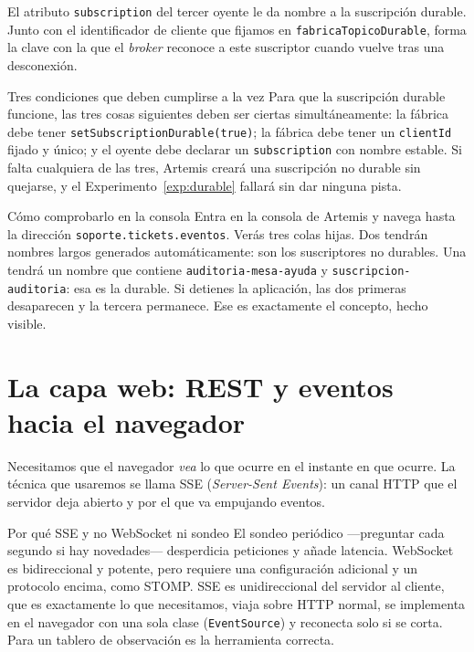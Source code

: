 \documentclass[11pt,a4paper]{book}
\begin{document}
El atributo \texttt{subscription} del tercer oyente le da nombre a la suscripción durable.
Junto con el identificador de cliente que fijamos en \texttt{fabricaTopicoDurable}, forma la clave con la que el \emph{broker} reconoce a este suscriptor cuando vuelve tras una desconexión.

\begin{cajaAviso}{Tres condiciones que deben cumplirse a la vez}
	Para que la suscripción durable funcione, las tres cosas siguientes deben ser ciertas simultáneamente:
	la fábrica debe tener \texttt{setSubscriptionDurable(true)};
	la fábrica debe tener un \texttt{clientId} fijado y único;
	y el oyente debe declarar un \texttt{subscription} con nombre estable.
	Si falta cualquiera de las tres, Artemis creará una suscripción no durable sin quejarse, y el Experimento~\ref{exp:durable} fallará sin dar ninguna pista.
\end{cajaAviso}

\begin{cajaTip}{Cómo comprobarlo en la consola}
	Entra en la consola de Artemis y navega hasta la dirección \texttt{soporte.tickets.eventos}.
	Verás tres colas hijas.
	Dos tendrán nombres largos generados automáticamente: son los suscriptores no durables.
	Una tendrá un nombre que contiene \texttt{auditoria-mesa-ayuda} y \texttt{suscripcion-auditoria}: esa es la durable.
	Si detienes la aplicación, las dos primeras desaparecen y la tercera permanece. Ese es exactamente el concepto, hecho visible.
\end{cajaTip}

\chapter{La capa web: REST y eventos hacia el navegador}
\label{cap:web}

Necesitamos que el navegador \emph{vea} lo que ocurre en el instante en que ocurre.
La técnica que usaremos se llama SSE (\emph{Server-Sent Events}): un canal HTTP que el servidor deja abierto y por el que va empujando eventos.

\begin{cajaNota}{Por qué SSE y no WebSocket ni sondeo}
	El sondeo periódico ---preguntar cada segundo si hay novedades--- desperdicia peticiones y añade latencia.
	WebSocket es bidireccional y potente, pero requiere una configuración adicional y un protocolo encima, como STOMP.
	SSE es unidireccional del servidor al cliente, que es exactamente lo que necesitamos, viaja sobre HTTP normal, se implementa en el navegador con una sola clase (\texttt{EventSource}) y reconecta solo si se corta.
	Para un tablero de observación es la herramienta correcta.
\end{cajaNota}
\end{document}
